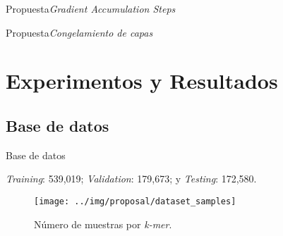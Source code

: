 \documentclass[10pt]{beamer}
\newcommand{\1}{
	\setbeamertemplate{background}{
		\texttt{[image: img/1]}
		\tikz[overlay] \fill[fill opacity=0.75,fill=white] (0,0) rectangle (-\paperwidth,\paperheight);
	}
}
\begin{document}
\begin{frame}{Propuesta}{\textit{Gradient Accumulation Steps}}
	
\end{frame}

\begin{frame}{Propuesta}{\textit{Congelamiento de capas}}
	
\end{frame}



\section{Experimentos y Resultados}

\subsection{Base de datos}

\begin{frame}{Base de datos}{}
	
	\textit{Training}: 539,019; \textit{Validation}: 179,673; y \textit{Testing}: 172,580.
	
	\begin{figure}[]
		\centering\texttt{[image: ../img/proposal/dataset\_samples]}
		\caption{
			Número de muestras por  \textit{k-mer}.}
		\label{fig:samples}
	\end{figure}
	
\end{frame}
\end{document}
